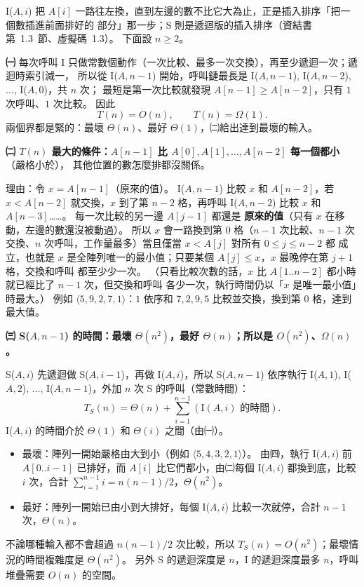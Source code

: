 \begin{pastsoln}
I($A, i$) 把 $A[i]$ 一路往左換，直到左邊的數不比它大為止，正是插入排序「把一個數插進前面排好的
部分」那一步；S 則是遞迴版的插入排序（資結書第~1.3~節、虛擬碼~1.3）。 下面設 $n \ge 2$。

\textbf{㈠} 每次呼叫 I 只做常數個動作（一次比較、最多一次交換），再至少遞迴一次；遞迴時索引減一，
所以從 I($A, n-1$) 開始，呼叫鏈最長是 I($A, n-1$), I($A, n-2$), $\ldots$, I($A, 0$)，共 $n$ 次；
最短是第一次比較就發現 $A[n-1] \ge A[n-2]$，只有 $1$ 次呼叫、$1$ 次比較。 因此
\[
T(n) = O(n), \qquad T(n) = \Omega(1).
\]
兩個界都是緊的：最壞 $\Theta(n)$、最好 $\Theta(1)$，㈡給出達到最壞的輸入。

\textbf{㈡ $T(n)$ 最大的條件：$A[n-1]$ 比 $A[0], A[1], \ldots, A[n-2]$ 每一個都小}（嚴格小於），
其他位置的數怎麼排都沒關係。

理由：令 $x = A[n-1]$（原來的值）。 I($A, n-1$) 比較 $x$ 和 $A[n-2]$，若 $x < A[n-2]$ 就交換，$x$
到了第 $n-2$ 格，再呼叫 I($A, n-2$) 比較 $x$ 和 $A[n-3]$……。 每一次比較的另一邊 $A[j-1]$ 都還是
\textbf{原來的值}（只有 $x$ 在移動，左邊的數還沒被動過）。 所以 $x$ 會一路換到第 $0$ 格（$n - 1$
次比較、$n - 1$ 次交換、$n$ 次呼叫，工作量最多）當且僅當 $x < A[j]$ 對所有 $0 \le j \le n-2$ 都
成立，也就是 $x$ 是全陣列唯一的最小值；只要某個 $A[j] \le x$，$x$ 最晚停在第 $j+1$ 格，交換和呼叫
都至少少一次。 （只看比較次數的話，$x$ 比 $A[1..n-2]$ 都小時就已經比了 $n-1$ 次，但交換和呼叫
各少一次，執行時間仍以「$x$ 是唯一最小值」時最大。） 例如 $\langle 5, 9, 2, 7, 1 \rangle$：$1$
依序和 $7, 2, 9, 5$ 比較並交換，換到第 $0$ 格，達到最大值。

\textbf{㈢ S($A, n-1$) 的時間：最壞 $\Theta(n^2)$，最好 $\Theta(n)$；所以是 $O(n^2)$、$\Omega(n)$。}

S($A, i$) 先遞迴做 S($A, i-1$)，再做 I($A, i$)，所以 S($A, n-1$) 依序執行
I($A, 1$), I($A, 2$), $\ldots$, I($A, n-1$)，外加 $n$ 次 S 的呼叫（常數時間）：
\[
T_S(n) = \Theta(n) + \sum_{i=1}^{n-1} (\text{I}(A, i) \text{ 的時間}).
\]
I($A, i$) 的時間介於 $\Theta(1)$ 和 $\Theta(i)$ 之間（由㈠）。
\begin{itemize}[nosep]
\item 最壞：陣列一開始嚴格由大到小（例如 $\langle 5, 4, 3, 2, 1 \rangle$）。 由㈣，執行
I($A, i$) 前 $A[0..i-1]$ 已排好，而 $A[i]$ 比它們都小，由㈡每個 I($A, i$) 都換到底，比較 $i$
次，合計 $\sum_{i=1}^{n-1} i = n(n-1)/2$，$\Theta(n^2)$。
\item 最好：陣列一開始已由小到大排好，每個 I($A, i$) 比較一次就停，合計 $n - 1$ 次，$\Theta(n)$。
\end{itemize}
不論哪種輸入都不會超過 $n(n-1)/2$ 次比較，所以 $T_S(n) = O(n^2)$；最壞情況的時間複雜度是
$\Theta(n^2)$。 另外 S 的遞迴深度是 $n$，I 的遞迴深度最多 $n$，呼叫堆疊需要 $O(n)$ 的空間。


\end{pastsoln}
